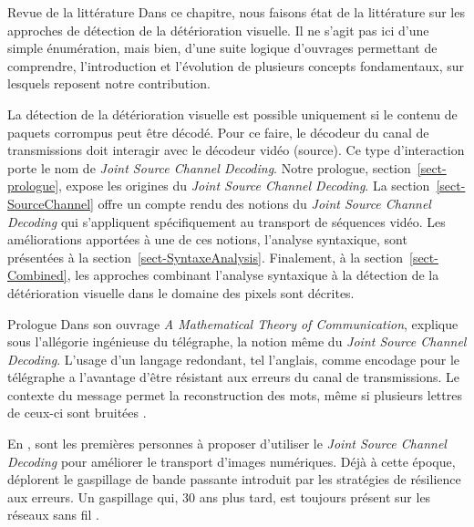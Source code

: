 \documentclass[letterpaper, twoside, 12pt,memoire]{thETS}
\newcommand{\sect}[1]{section~\ref{#1}}
\begin{document}
\begin{chapter}{Revue de la littérature}
Dans ce chapitre, nous faisons état de la littérature sur les approches de
détection de la détérioration visuelle. Il ne s’agit pas ici d’une simple
énumération, mais bien, d’une suite logique d’ouvrages permettant de comprendre,
l’introduction et l’évolution de plusieurs concepts fondamentaux, sur lesquels
reposent notre contribution.

La détection de la détérioration visuelle est possible uniquement si le contenu
de paquets corrompus peut être décodé. Pour ce faire, le décodeur du canal de
transmissions doit interagir avec le décodeur vidéo (source). Ce type
d'interaction porte le nom de \textit{Joint Source Channel Decoding}. Notre
prologue, \sect{sect-prologue}, expose les origines du \textit{Joint Source
Channel Decoding}. La \sect{sect-SourceChannel} offre un compte rendu des
notions du \textit{Joint Source Channel Decoding} qui s'appliquent
spécifiquement au transport de séquences vidéo. Les améliorations apportées à
une de ces notions, l'analyse syntaxique, sont présentées à la
\sect{sect-SyntaxeAnalysis}. Finalement, à la \sect{sect-Combined}, les
approches combinant l'analyse syntaxique à la détection de la détérioration
visuelle dans le domaine des pixels sont décrites.


\begin{section}{Prologue}
\label{sect-prologue}
Dans son ouvrage \textit{A Mathematical Theory of Communication},
\citet{Shannon1948} explique sous l'allégorie ingénieuse du télégraphe, la
notion même du \textit{Joint Source Channel Decoding}. L'usage d'un langage
redondant, tel l'anglais, comme encodage pour le télégraphe a l'avantage d'être
résistant aux erreurs du canal de transmissions. Le contexte du message permet
la reconstruction des mots, même si plusieurs lettres de ceux-ci sont bruitées
\citep[p.~24]{Shannon1948}.

En \citeyear{Modestino1979}, \citeauthor{Modestino1979} sont les premières personnes à
proposer d'utiliser le \textit{Joint Source Channel Decoding} pour améliorer le
transport d'images numériques. Déjà à cette époque, \citeauthor{Modestino1979}
déplorent le gaspillage de bande passante introduit par les stratégies de
résilience aux erreurs. Un gaspillage qui, 30 ans plus tard, est toujours
présent sur les réseaux sans fil \citep[p.1]{Duhamel2010}.


\end{section}
\end{chapter}
\end{document}
